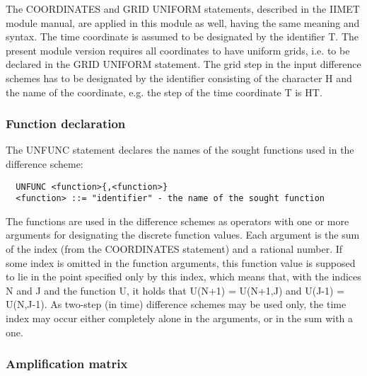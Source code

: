      The COORDINATES and GRID UNIFORM statements, described in the IIMET
module  manual,  are  applied  in  this  module as well, having the same
meaning and syntax. The time coordinate is assumed  to be  designated by
the identifier T. The present module version requires all coordinates to
have uniform grids, i.e. to be declared in  the GRID  UNIFORM statement.
The grid  step in  the input  difference schemes has to be designated by
the identifier consisting  of  the  character  H  and  the  name  of the
coordinate, e.g. the step of the time coordinate T is HT.


\subsubsection{Function declaration}


     The  UNFUNC  statement  declares  the names of the sought functions
used in the difference scheme:
\begin{verbatim}
  UNFUNC <function>{,<function>}
  <function> ::= "identifier" - the name of the sought function
\end{verbatim}
The functions are used in the difference schemes  as operators  with one
or  more  arguments  for  designating the discrete function values. Each
argument is the sum of the index (from the COORDINATES  statement) and a
rational number.  If some  index is  omitted in  the function arguments,
this function value is supposed to  lie in  the point  specified only by
this index,  which means that, with the indices N and J and the function
U, it holds that U(N+1) =  U(N+1,J) and  U(J-1) =  U(N,J-1). As two-step
(in time)  difference schemes may be used only, the time index may occur
either completely alone in the arguments, or in the sum with a one.


\subsubsection{Amplification matrix}

